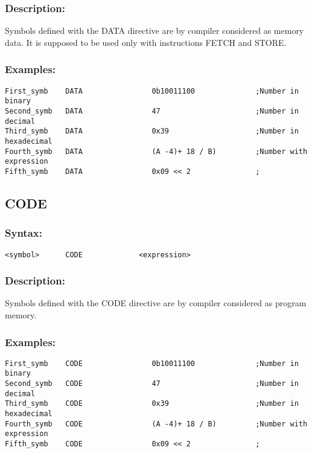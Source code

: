         \subsubsection{Description:}
            Symbols defined with the DATA directive are by compiler considered as memory data. It is supposed to be used only with instructions FETCH and STORE.

        \subsubsection{Examples:}
            {
                \usecodefont
                \verb'First_symb    DATA                0b10011100              ;Number in binary'\\
                \verb'Second_symb   DATA                47                      ;Number in decimal'\\
                \verb'Third_symb    DATA                0x39                    ;Number in hexadecimal'\\
                \verb'Fourth_symb   DATA                (A -4)+ 18 / B)         ;Number with expression'\\
                \verb'Fifth_symb    DATA                0x09 << 2               ;'\\
            }

    \subsection{CODE}
        \subsubsection{Syntax:}
            {
                \usecodefont
                \verb'<symbol>      CODE             <expression>'
            }

        \subsubsection{Description:}
            Symbols defined with the CODE directive are by compiler considered as program memory.

        \subsubsection{Examples:}
            {
                \usecodefont
                \verb'First_symb    CODE                0b10011100              ;Number in binary'\\
                \verb'Second_symb   CODE                47                      ;Number in decimal'\\
                \verb'Third_symb    CODE                0x39                    ;Number in hexadecimal'\\
                \verb'Fourth_symb   CODE                (A -4)+ 18 / B)         ;Number with expression'\\
                \verb'Fifth_symb    CODE                0x09 << 2               ;'\\
            }

